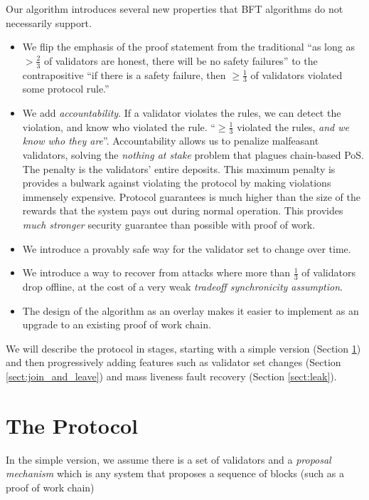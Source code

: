 \documentclass[12pt]{article}
\begin{document}
Our algorithm introduces several new properties that BFT algorithms do not necessarily support.
\begin{itemize}
\item We flip the emphasis of the proof statement from the traditional ``as long as $>\frac{2}{3}$ of validators are honest, there will be no safety failures'' to the contrapositive ``if there is a safety failure, then $\ge \frac{1}{3}$ of validators violated some protocol rule.''

\item We add \textit{accountability}.  If a validator violates the rules, we can detect the violation, and know who violated the rule.  ``$\ge \frac{1}{3}$ violated the rules, \textit{and we know who they are}''.  Accountability allows us to penalize malfeasant validators, solving the \textit{nothing at stake} problem\cite{} that plagues chain-based PoS. The penalty is the validators' entire deposits.  This maximum penalty is provides a bulwark against violating the protocol by making violations immensely expensive.  Protocol guarantees is much higher than the size of the rewards that the system pays out during normal operation.  This provides \textit{much stronger} security guarantee than possible with proof of work.

\item We introduce a provably safe way for the validator set to change over time.
\item We introduce a way to recover from attacks where more than $\frac{1}{3}$ of validators drop offline, at the cost of a very weak \textit{tradeoff synchronicity assumption}.
\item The design of the algorithm as an overlay makes it easier to implement as an upgrade to an existing proof of work chain.
\end{itemize}

We will describe the protocol in stages, starting with a simple version (Section \ref{sect:protocol}) and then progressively adding features such as validator set changes (Section \ref{sect:join_and_leave}) and mass liveness fault recovery (Section \ref{sect:leak}). 


\section{The Protocol}
\label{sect:protocol}
In the simple version, we assume there is a set of validators and a \textit{proposal mechanism} which is any system that proposes a sequence of blocks (such as a proof of work chain)
\end{document}

